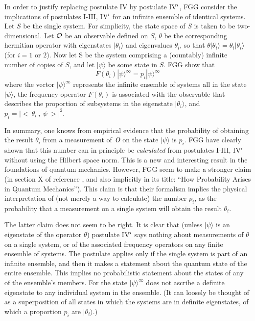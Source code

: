 \documentclass[aps,pra,12pt]{revtex4}
\def\ket#1{| #1\rangle}
\begin{document}
In order to justify replacing postulate IV by postulate I${\rm
V}^{\prime}$, FGG consider the implications of postulates I-III,
I${\rm V}^{\prime}$ for an infinite ensemble of identical systems.
Let $S$ be the single system.  For simplicity, the state space of $S$
is taken to be two-dimensional.  Let ${\cal O}$ be an observable defined
on $S$, $\theta$ be the corresponding hermitian operator with
eigenstates $\ket {\theta_i}$ and eigenvalues $\theta_i$, so that
$\theta \ket {\theta_i} = \theta_i \ket{\theta_i}$ (for $i = 1$ or
$2$).  Now let S be the system comprising a (countably) infinite
number of copies of $S$, and let $\ket{\psi}$ be some state in $S$.
FGG show that
\begin{equation}\label{eigen}
F( \theta_i ) \ket{\psi}^{\infty} = p_i \ket{\psi}^{\infty}
\end{equation}
where the vector $\ket{\psi}^{\infty}$ represents the infinite
ensemble of systems all in the state $\ket{\psi}$, the frequency
operator $F( \theta_i )$ is associated with the observable that
describes the proportion of subsystems in the eigenstate
$\ket{\theta_i}$, and $p_i = | <~\theta_i ~,~ \psi ~> |^2$.

In summary, one knows from empirical evidence that the probability of
obtaining the result $\theta_i$ from a measurement of ${\textit O}$ on the
state $\ket{\psi}$ is $p_i$.  FGG have clearly shown that this number
can in principle be {\em calculated} from postulates I-III, I${\rm V}^{\prime}$
without using the Hilbert space norm.  This is a new and interesting
result in the foundations of quantum mechanics.  However, FGG seem to
make a stronger claim (in section X of reference \cite{fgg}, and also
implicitly in its title: ``How Probability Arises in Quantum
Mechanics'').  This claim is that their formalism implies the physical
interpretation of (not merely a way to calculate) the number $p_i$, as
the probability that a measurement on a single system will obtain the
result $\theta_i$.

The latter claim does not seem to be right.  It is clear that (unless
$\ket{\psi}$ is an eigenstate of the operator $\theta$) postulate
I${\rm V}^{\prime}$ says nothing about measurements of $\theta$ on a
single system, or of the associated frequency operators on any finite
ensemble of systems.  The postulate applies only if the single system
is part of an infinite ensemble, and then it makes a statement about
the quantum state of the entire ensemble.  This implies no
probabilistic statement about the states of any of the ensemble's
members.  For the state $\ket{\psi}^{\infty}$ does not ascribe a
definite eigenstate to any individual system in the ensemble.  (It can
loosely be thought of as a superposition of all states in which the
systems are in definite eigenstates, of which a proportion $p_i$ are
$\ket{\theta_i}$.)
\end{document}
